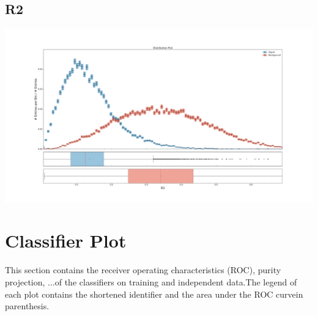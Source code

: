 \documentclass[10pt,a4paper]{article}
\begin{document}
\subsection{R2}
\begin{center}
\includegraphics[width=1.0\textwidth]{variable_-3336118325515913101.pdf}
\end{center}
\raggedbottom
\pagebreak[0]
\FloatBarrier
\section{Classifier Plot}
This section contains the receiver operating characteristics (ROC), purity projection, ...of the classifiers on training and independent data.The legend of each plot contains the shortened identifier and the area under the ROC curvein parenthesis.\raggedbottom
\pagebreak[0]
\FloatBarrier
\end{document}

